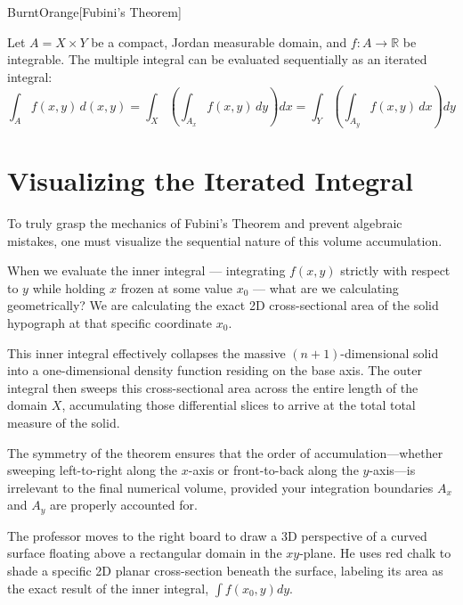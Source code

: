 \begin{color-box}{BurntOrange}[Fubini's Theorem]
\begin{theorem}
Let $A = X \times Y$ be a compact, Jordan measurable domain, and $f: A \to \mathbb{R}$ be integrable. The multiple integral can be evaluated sequentially as an iterated integral:
\[
\int_A f(x,y) \, d(x,y) = \int_X \left( \int_{A_x} f(x,y) \, dy \right) dx = \int_Y \left( \int_{A_y} f(x,y) \, dx \right) dy
\]
\end{theorem}
\end{color-box}

\section{Visualizing the Iterated Integral}

\begin{spoken-clean}[38:00 - 42:30]
To truly grasp the mechanics of Fubini's Theorem and prevent algebraic mistakes, one must visualize the sequential nature of this volume accumulation. 

When we evaluate the inner integral — integrating $f(x,y)$ strictly with respect to $y$ while holding $x$ frozen at some value $x_0$ — what are we calculating geometrically? We are calculating the exact 2D cross-sectional area of the solid hypograph at that specific coordinate $x_0$. 

This inner integral effectively collapses the massive $(n+1)$-dimensional solid into a one-dimensional density function residing on the base axis. The outer integral then sweeps this cross-sectional area across the entire length of the domain $X$, accumulating those differential slices to arrive at the total total measure of the solid. 

The symmetry of the theorem ensures that the order of accumulation—whether sweeping left-to-right along the $x$-axis or front-to-back along the $y$-axis—is irrelevant to the final numerical volume, provided your integration boundaries $A_x$ and $A_y$ are properly accounted for.
\end{spoken-clean}

\begin{ai-note}
The professor moves to the right board to draw a 3D perspective of a curved surface floating above a rectangular domain in the $xy$-plane. He uses red chalk to shade a specific 2D planar cross-section beneath the surface, labeling its area as the exact result of the inner integral, $\int f(x_0, y) dy$.
\end{ai-note}

